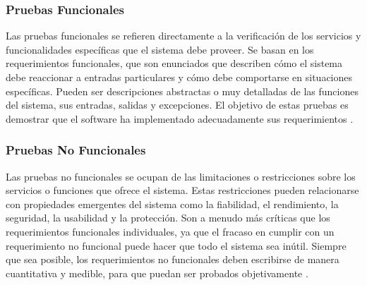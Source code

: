 \subsubsection{Pruebas Funcionales}
Las pruebas funcionales se refieren directamente a la verificación de los servicios y funcionalidades específicas que el sistema debe proveer. Se basan en los requerimientos funcionales, que son enunciados que describen cómo el sistema debe reaccionar a entradas particulares y cómo debe comportarse en situaciones específicas. Pueden ser descripciones abstractas o muy detalladas de las funciones del sistema, sus entradas, salidas y excepciones. El objetivo de estas pruebas es demostrar que el software ha implementado adecuadamente sus requerimientos \cite{sommerville2011software}.

\subsubsection{Pruebas No Funcionales}
Las pruebas no funcionales se ocupan de las limitaciones o restricciones sobre los servicios o funciones que ofrece el sistema. Estas restricciones pueden relacionarse con propiedades emergentes del sistema como la fiabilidad, el rendimiento, la seguridad, la usabilidad y la protección. Son a menudo más críticas que los requerimientos funcionales individuales, ya que el fracaso en cumplir con un requerimiento no funcional puede hacer que todo el sistema sea inútil. Siempre que sea posible, los requerimientos no funcionales deben escribirse de manera cuantitativa y medible, para que puedan ser probados objetivamente \cite{sommerville2011software}.


